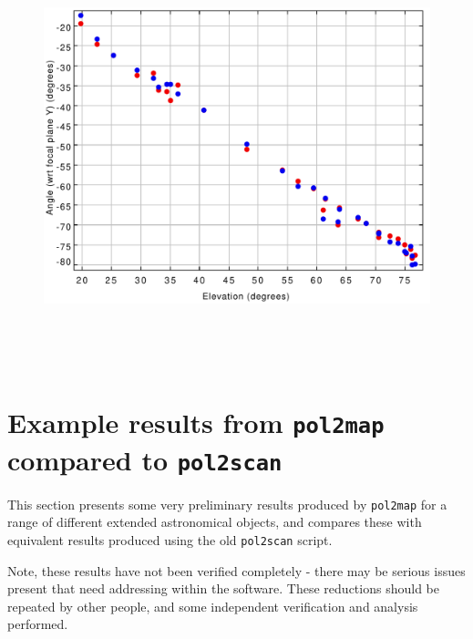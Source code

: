 \documentclass[twoside,11pt]{starlink}
\begin{document}
\begin{figure}
\centering
\begin{minipage}{.45\textwidth}
  \centering
  \includegraphics[width=.95\linewidth]{ip/fig5}
\end{minipage}
~~
\begin{minipage}{.45\textwidth}
~~
  \centering
\end{minipage}
\end{figure}


\section{Example results from \texttt{pol2map} compared to \texttt{pol2scan}\label{sec:results}}
This section presents some very preliminary results produced by
\texttt{pol2map} for a range of different extended astronomical objects,
and compares these with equivalent results produced using the old
\texttt{pol2scan} script.

Note, these results have not been verified completely - there may be
serious issues present that need addressing within the software. These
reductions should be repeated by other people, and some independent
verification and analysis performed.
\end{document}
